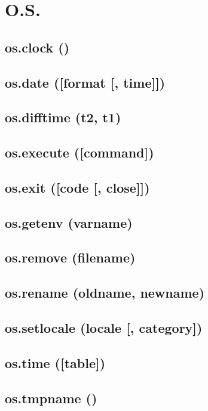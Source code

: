 \documentclass[12pt]{article}
\begin{document}
\section{O.S.}

\subsection{os.clock ()}

\subsection{os.date ([format [, time]])}

\subsection{os.difftime (t2, t1)}

\subsection{os.execute ([command])}

\subsection{os.exit ([code [, close]])}

\subsection{os.getenv (varname)}

\subsection{os.remove (filename)}

\subsection{os.rename (oldname, newname)}

\subsection{os.setlocale (locale [, category])}

\subsection{os.time ([table])}

\subsection{os.tmpname ()}
\end{document}

